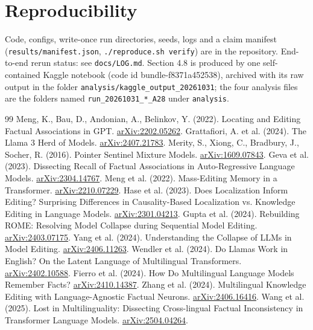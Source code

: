 \documentclass[11pt]{article}
\begin{document}
\section{Reproducibility}
Code, configs, write-once run directories, seeds, logs and a claim manifest (\texttt{results/manifest.json}, \texttt{./reproduce.sh\ verify}) are in the repository. End-to-end rerun status: see \texttt{docs/LOG.md}. Section 4.8 is produced by one self-contained Kaggle notebook (code id bundle-f8371a452538), archived with its raw output in the folder \texttt{analysis/kaggle\_output\_20261031}; the four analysis files are the folders named \texttt{run\_20261031\_*\_A28} under \texttt{analysis}.
\begin{thebibliography}{99}\small
{} Meng, K., Bau, D., Andonian, A., Belinkov, Y. (2022). Locating and Editing Factual Associations in GPT. \href{https://arxiv.org/abs/2202.05262}{arXiv:2202.05262}.
 Grattafiori, A. et al. (2024). The Llama 3 Herd of Models. \href{https://arxiv.org/abs/2407.21783}{arXiv:2407.21783}.
 Merity, S., Xiong, C., Bradbury, J., Socher, R. (2016). Pointer Sentinel Mixture Models. \href{https://arxiv.org/abs/1609.07843}{arXiv:1609.07843}.
 Geva et al. (2023). Dissecting Recall of Factual Associations in Auto-Regressive Language Models. \href{https://arxiv.org/abs/2304.14767}{arXiv:2304.14767}.
 Meng et al. (2022). Mass-Editing Memory in a Transformer. \href{https://arxiv.org/abs/2210.07229}{arXiv:2210.07229}.
 Hase et al. (2023). Does Localization Inform Editing? Surprising Differences in Causality-Based Localization vs. Knowledge Editing in Language Models. \href{https://arxiv.org/abs/2301.04213}{arXiv:2301.04213}.
 Gupta et al. (2024). Rebuilding ROME: Resolving Model Collapse during Sequential Model Editing. \href{https://arxiv.org/abs/2403.07175}{arXiv:2403.07175}.
 Yang et al. (2024). Understanding the Collapse of LLMs in Model Editing. \href{https://arxiv.org/abs/2406.11263}{arXiv:2406.11263}.
 Wendler et al. (2024). Do Llamas Work in English? On the Latent Language of Multilingual Transformers. \href{https://arxiv.org/abs/2402.10588}{arXiv:2402.10588}.
 Fierro et al. (2024). How Do Multilingual Language Models Remember Facts? \href{https://arxiv.org/abs/2410.14387}{arXiv:2410.14387}.
 Zhang et al. (2024). Multilingual Knowledge Editing with Language-Agnostic Factual Neurons. \href{https://arxiv.org/abs/2406.16416}{arXiv:2406.16416}.
 Wang et al. (2025). Lost in Multilinguality: Dissecting Cross-lingual Factual Inconsistency in Transformer Language Models. \href{https://arxiv.org/abs/2504.04264}{arXiv:2504.04264}.

\end{thebibliography}
\end{document}
